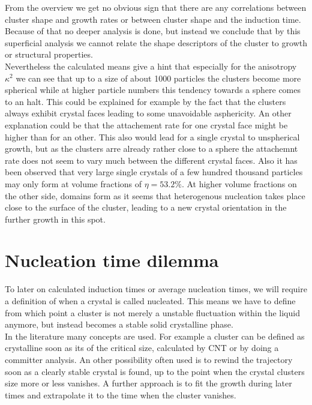 From the overview we get no obvious sign that there are any correlations between cluster shape and growth rates or between cluster shape and the induction time. Because of that no deeper analysis is done, but instead we conclude that by this superficial analysis we cannot relate the shape descriptors of the cluster to growth or structural properties.\\

Nevertheless the calculated means give a hint that especially for the anisotropy $\kappa^2$ we can see that up to a size of about 1000 particles the clusters become more spherical while at higher particle numbers this tendency towards a sphere comes to an halt. This could be explained for example by the fact that the clusters always exhibit crystal faces leading to some unavoidable asphericity. An other explanation could be that the attachement rate for one crystal face might be higher than for an other. This also would lead for a single crystal to unspherical growth, but as the clusters arre already rather close to a sphere the attachemnt rate does not seem to vary much between the different crystal faces. Also it has been observed that very large single crystals of a few hundred thousand particles may only form at volume fractions of $\eta = 53.2 \%$. At higher volume fractions on the other side, domains form as it seems that heterogenous nucleation takes place close to the surface of the cluster, leading to a new crystal orientation in the further growth in this spot.\\


\section{Nucleation time dilemma}
\label{sec:nucleation_times}
To later on calculated induction times or average nucleation times, we will require a definition of when a crystal is called nucleated. This means we have to define from which point a cluster is not merely a unstable fluctuation within the liquid anymore, but instead becomes a stable solid crystalline phase.\\ 
In the literature many concepts are used. For example a cluster can be defined as crystalline soon as its of the critical size, calculated by CNT or by doing a committer analysis. An other possibility often used is to rewind the trajectory soon as a clearly stable crystal is found, up to the point when the crystal clusters size more or less vanishes. A further approach is to fit the growth during later times and extrapolate it to the time when the cluster vanishes.\\

